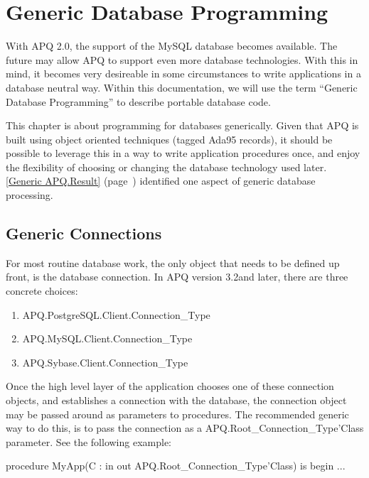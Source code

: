 \documentclass[english,letterpaper]{book}
\newcommand\Ref[1]{\textsection\ref{#1} (page~\pageref{#1})}
\newcommand\apqversion{3.2}
\begin{document}
\chapter{Generic Database Programming}

With APQ 2.0, the support of the MySQL database becomes available.
The future may allow APQ to support even more database technologies.
With this in mind, it becomes very desireable in some circumstances
to write applications in a database neutral way. Within this documentation,
we will use the term ``Generic Database Programming'' to describe
portable database code.

This chapter is about programming for databases generically. Given
that APQ is built using object oriented techniques (tagged Ada95 records),
it should be possible to leverage this in a way to write application
procedures once, and enjoy the flexibility of choosing or changing
the database technology used later. \Ref{Generic APQ.Result}
identified one aspect of generic database processing.


\section{Generic Connections}

For most routine database work, the only object that needs to be defined
up front, is the database connection. In APQ version \apqversion and later,
there are three concrete choices:

\begin{enumerate}
   \item APQ.PostgreSQL.Client.Connection\_Type
   \item APQ.MySQL.Client.Connection\_Type
   \item APQ.Sybase.Client.Connection\_Type
\end{enumerate}

Once the high level layer of the application chooses one of these
connection objects, and establishes a connection with the database,
the connection object may be passed around as parameters to procedures.
The recommended generic way to do this, is to pass the connection
as a APQ\-.Root\_Connection\_Type\-'Class parameter. See the following
example:

\begin{Example}
procedure MyApp(C : in out APQ.Root_Connection_Type'Class) is
begin
   ...
\end{Example}
\end{document}
